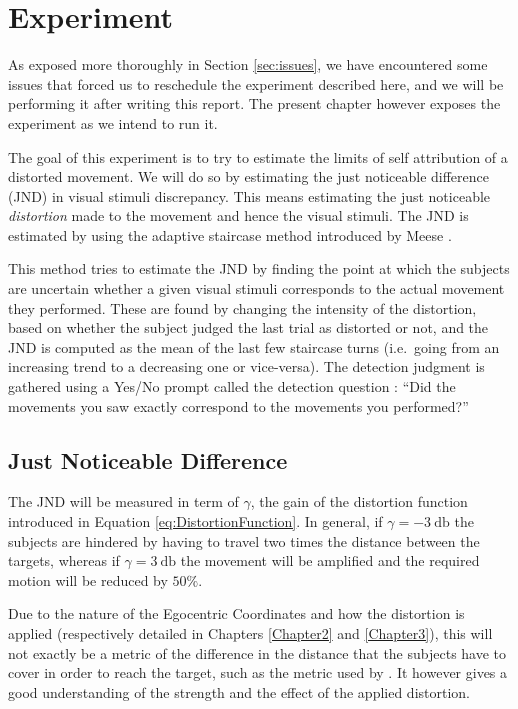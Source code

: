 
\chapter{Experiment} %

\label{Chapter4} %

As exposed more thoroughly in Section \ref{sec:issues}, we have encountered some issues that forced us to reschedule the experiment described here, and we will be performing it after writing this report. The present chapter however exposes the experiment as we intend to run it.

The goal of this experiment is to try to estimate the limits of self attribution of a distorted movement. We will do so by estimating the just noticeable difference (JND) in visual stimuli discrepancy. This means estimating the just noticeable \textit{distortion} made to the movement and hence the visual stimuli. The JND is estimated by using the adaptive staircase method introduced by Meese \cite{meese1995using}.

This method tries to estimate the JND by finding the point at which the subjects are uncertain whether a given visual stimuli corresponds to the actual movement they performed. These are found by changing the intensity of the distortion, based on whether the subject judged the last trial as distorted or not, and the JND is computed as the mean of the last few staircase turns (i.e.\ going from an increasing trend to a decreasing one or vice-versa). The detection judgment is gathered using a Yes/No prompt called the detection question : ``Did the movements you saw exactly correspond to the movements you performed?''

\section{Just Noticeable Difference}

The JND will be measured in term of $\gamma$, the gain of the distortion function introduced in Equation \ref{eq:DistortionFunction}. In general, if $\gamma = \SI{-3}{\decibel}$ the subjects are hindered by having to travel two times the distance between the targets, whereas if $\gamma = \SI{3}{\decibel}$ the movement will be amplified and the required motion will be reduced by $50\%$.

Due to the nature of the Egocentric Coordinates and how the distortion is applied (respectively detailed in Chapters \ref{Chapter2} and \ref{Chapter3}), this will not exactly be a metric of the difference in the distance that the subjects have to cover in order to reach the target, such as the metric used by \cite{debarba2017embodiment}. It however gives a good understanding of the strength and the effect of the applied distortion.

